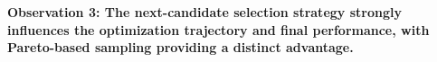 \documentclass{article} %
\begin{document}
\textbf{Observation 3: The next-candidate selection strategy strongly influences the optimization trajectory and final performance, with Pareto-based sampling providing a distinct advantage.}


\end{document}
